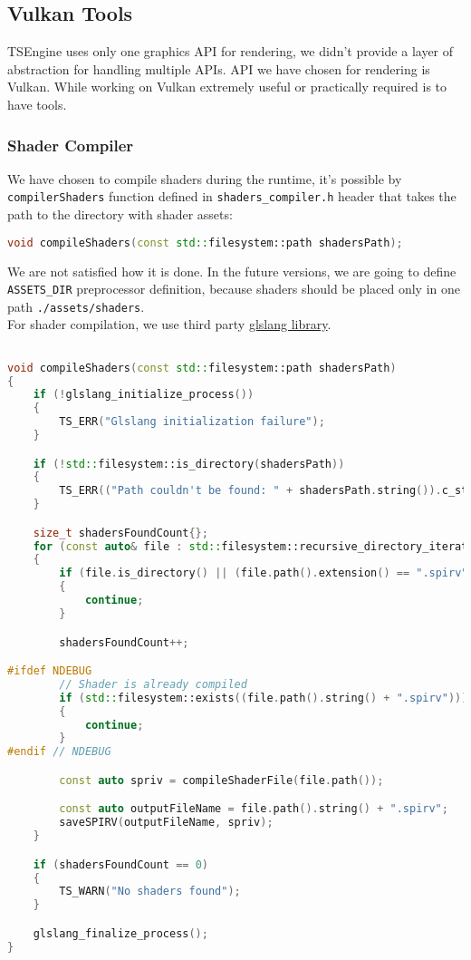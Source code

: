 \newpage

\subsection{Vulkan Tools}
TSEngine uses only one graphics API for rendering, we didn't provide a layer of abstraction for handling multiple APIs. API we have chosen for rendering is Vulkan. While working on Vulkan extremely useful or practically required is to have tools.
\subsubsection{Shader Compiler}
\label{sec:shader_compiler}
We have chosen to compile shaders during the runtime, it's possible by \texttt{compilerShaders} function defined in \texttt{shaders\_compiler.h} header that takes the path to the directory with shader assets: %
\begin{lstlisting}[language=c++, caption=Shaders Compiler header (./engine/src/vulkan\_tools/shaders\_compiler.h)]
void compileShaders(const std::filesystem::path shadersPath);
\end{lstlisting}
We are not satisfied how it is done. In the future versions, we are going to define \texttt{ASSETS\_DIR} preprocessor definition, because shaders should be placed only in one path \texttt{./assets/shaders}.\\
For shader compilation, we use third party \hyperref[lst:3rdparty]{glslang library}.
\begin{lstlisting}[language=c++, caption=Shader Compiler implementation(./engine/src/vulkan\_tools/shaders\_compiler.cpp)]

void compileShaders(const std::filesystem::path shadersPath)
{
    if (!glslang_initialize_process())
    {
        TS_ERR("Glslang initialization failure");
    }

    if (!std::filesystem::is_directory(shadersPath))
    {
        TS_ERR(("Path couldn't be found: " + shadersPath.string()).c_str());
    }

    size_t shadersFoundCount{};
    for (const auto& file : std::filesystem::recursive_directory_iterator(shadersPath))
    {
        if (file.is_directory() || (file.path().extension() == ".spirv") || (file.path().extension() == ".h"))
        {
            continue;
        }

        shadersFoundCount++;

#ifdef NDEBUG
        // Shader is already compiled
        if (std::filesystem::exists((file.path().string() + ".spirv")))
        {
            continue;
        }
#endif // NDEBUG

        const auto spriv = compileShaderFile(file.path());

        const auto outputFileName = file.path().string() + ".spirv";
        saveSPIRV(outputFileName, spriv);
    }

    if (shadersFoundCount == 0)
    {
        TS_WARN("No shaders found");
    }

    glslang_finalize_process();
}
\end{lstlisting}
